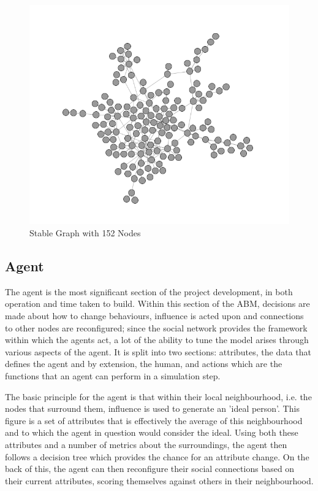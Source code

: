 \documentclass[]{report}
\begin{document}
\begin{figure}
\label{img:post-watchman}
\begin{center}
\includegraphics[scale=0.25]{post-balance.png}
\end{center}
\caption{Stable Graph with 152 Nodes}
\end{figure}

\subsection{Agent}
\label{sec:agent}
The agent is the most significant section of the project development, in both operation and time taken to build. Within this section of the ABM, decisions are made about how to change behaviours, influence is acted upon and connections to other nodes are reconfigured; since the social network provides the framework within which the agents act, a lot of the ability to tune the model arises through various aspects of the agent. It is split into two sections: attributes, the data that defines the agent and by extension, the human, and actions which are the functions that an agent can perform in a simulation step.

The basic principle for the agent is that within their local neighbourhood, i.e. the nodes that surround them, influence is used to generate an 'ideal person'. This figure is a set of attributes that is effectively the average of this neighbourhood and to which the agent in question would consider the ideal. Using both these attributes and a number of metrics about the surroundings, the agent then follows a decision tree which provides the chance for an attribute change. On the back of this, the agent can then reconfigure their social connections based on their current attributes, scoring themselves against others in their neighbourhood.
\end{document}
